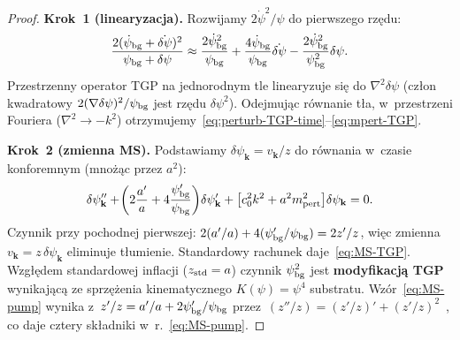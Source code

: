 \begin{proof}
\textbf{Krok~1 (linearyzacja).}
Rozwijamy $2\dot\psi^2/\psi$ do pierwszego rz\k{e}du:
\[
  \frac{2(\dot\psi_{\rm bg}+\dot{\delta\psi})^2}{\psi_{\rm bg}+\delta\psi}
  \approx
  \frac{2\dot\psi_{\rm bg}^2}{\psi_{\rm bg}}
  + \frac{4\dot\psi_{\rm bg}}{\psi_{\rm bg}}\dot{\delta\psi}
  - \frac{2\dot\psi_{\rm bg}^2}{\psi_{\rm bg}^2}\delta\psi.
\]
Przestrzenny operator TGP na jednorodnym tle linearyzuje si\k{e} do $\nabla^2\delta\psi$
(cz\l{}on kwadratowy $2(\nabla\delta\psi)^2/\psi_{\rm bg}$ jest rz\k{e}du $\delta\psi^2$).
Odejmuj\k{a}c r\'ownanie t\l{}a, w~przestrzeni Fouriera
($\nabla^2 \to -k^2$) otrzymujemy~\eqref{eq:perturb-TGP-time}--\eqref{eq:mpert-TGP}.

\textbf{Krok~2 (zmienna MS).}
Podstawiamy $\delta\psi_{\mathbf{k}} = v_{\mathbf{k}}/z$ do r\'ownania
w~czasie konforemnym (mno\.z\k{a}c przez $a^2$):
\[
  \delta\psi_{\mathbf{k}}'' + \!\left(2\frac{a'}{a} + 4\frac{\psi_{\rm bg}'}{\psi_{\rm bg}}\right)
  \!\delta\psi_{\mathbf{k}}' + \bigl[c_0^2 k^2 + a^2 m_{\rm pert}^2\bigr]\delta\psi_{\mathbf{k}} = 0.
\]
Czynnik przy pochodnej pierwszej: $2(a'/a) + 4(\psi_{\rm bg}'/\psi_{\rm bg}) = 2z'/z$,
wi\k{e}c zmienna $v_{\mathbf{k}} = z\,\delta\psi_{\mathbf{k}}$ eliminuje
t\l{}umienie. Standardowy rachunek daje~\eqref{eq:MS-TGP}.
Wzg\l{}\k{e}dem standardowej inflacji ($z_{\rm std} = a$) czynnik
$\psi_{\rm bg}^2$ jest \textbf{modyfikacj\k{a} TGP} wynikaj\k{a}c\k{a}
ze sprz\k{e}\.zenia kinematycznego $K(\psi) = \psi^4$ substratu.
Wzór~\eqref{eq:MS-pump} wynika z~$z'/z = a'/a + 2\psi_{\rm bg}'/\psi_{\rm bg}$
przez~$(z''/z) = (z'/z)' + (z'/z)^2$~, co daje cztery sk\l{}adniki
w~r.~\eqref{eq:MS-pump}.
\end{proof}

